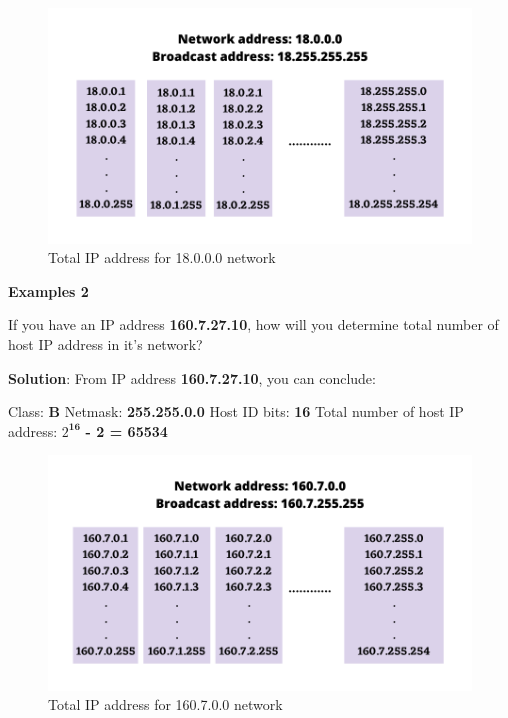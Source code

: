 \begin{flushleft}
\begin{figure}[h!]
	\centering
	\includegraphics[scale=.6]{content/chapter14/images/calculation.png}
	\caption{Total IP address for 18.0.0.0 network}
	\label{fig:network1}
\end{figure}	

\newpage

\textbf{Examples 2}

If you have an IP address \textbf{160.7.27.10}, how will you determine total number of host IP address in it's network?	

\textbf{Solution}: From IP address \textbf{160.7.27.10}, you can conclude:
\begin{tcolorbox}[breakable,notitle,boxrule=-0pt,colback=pink,colframe=pink]
	\color{black}
	Class: \textbf{B}
	\newline
	Netmask: \textbf{255.255.0.0}
	\newline
	Host ID bits: \textbf{16}
	\newline
	Total number of host IP address: \textbf{$2^\textbf{16}$} \textbf{- 2 = 65534}
\end{tcolorbox}	

\begin{figure}[h!]
	\centering
	\includegraphics[scale=.6]{content/chapter14/images/calculation2.png}
	\caption{Total IP address for 160.7.0.0 network}
	\label{fig:network1}
\end{figure}	


\end{flushleft}
